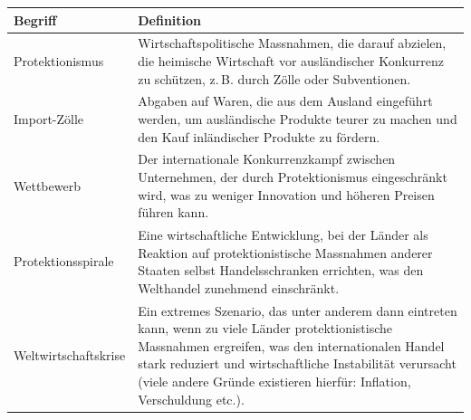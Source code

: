 \begin{myexercise}
    \begin{myanswer}
        \begin{table}[H]
            \centering\small
            \begin{tabular}{l|p{10cm}}
                \textbf{Begriff}     & \textbf{Definition}                                                                                                                                                                                                                                                                            \\
                \midrule\midrule
                Protektionismus      & Wirtschaftspolitische Massnahmen, die darauf abzielen, die heimische Wirtschaft vor ausländischer Konkurrenz zu schützen, z. B. durch Zölle oder Subventionen.                                                                                                                                 \\\midrule
                Import-Zölle         & Abgaben auf Waren, die aus dem Ausland eingeführt werden, um ausländische Produkte teurer zu machen und den Kauf inländischer Produkte zu fördern.                                                                                                                                             \\\midrule
                Wettbewerb           & Der internationale Konkurrenzkampf zwischen Unternehmen, der durch Protektionismus eingeschränkt wird, was zu weniger Innovation und höheren Preisen führen kann.                                                                                                                              \\\midrule
                Protektionsspirale   & Eine wirtschaftliche Entwicklung, bei der Länder als Reaktion auf protektionistische Massnahmen anderer Staaten selbst Handelsschranken errichten, was den Welthandel zunehmend einschränkt.                                                                                                   \\\midrule
                Weltwirtschaftskrise & Ein extremes Szenario, das unter anderem dann eintreten kann, wenn zu viele Länder protektionistische Massnahmen ergreifen, was den internationalen Handel stark reduziert und wirtschaftliche Instabilität verursacht (viele andere Gründe existieren hierfür: Inflation, Verschuldung etc.). \\
            \end{tabular}
        \end{table}
    \end{myanswer}
\end{myexercise}

